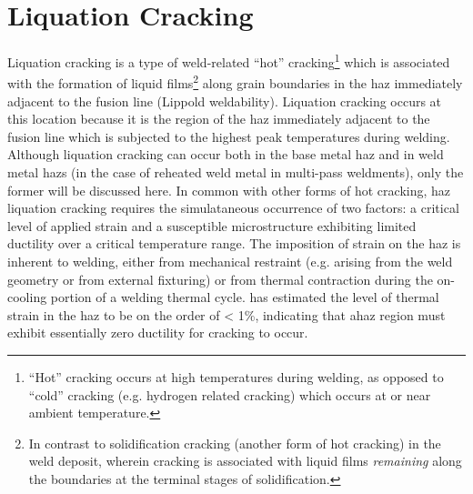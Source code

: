 \section{Liquation Cracking} \label{sec:liquation-cracking}
Liquation cracking is a type of weld-related “hot” cracking\footnote{“Hot” cracking occurs at high temperatures during welding, as opposed to “cold” cracking (e.g. hydrogen related cracking) which occurs at or near ambient temperature.} which is associated with the formation of liquid films\footnote{In contrast to solidification cracking (another form of hot cracking) in the weld deposit, wherein cracking is associated with liquid films \emph{remaining} along the boundaries at the terminal stages of solidification.} along grain boundaries in the \gls{haz} immediately adjacent to the fusion line (Lippold weldability). Liquation cracking occurs at this location because it is the region of the \gls{haz} immediately adjacent to the fusion line which is subjected to the highest peak temperatures during welding. Although liquation cracking can occur both in the base metal \gls{haz} and in weld metal \gls{haz}s (in the case of reheated weld metal in multi-pass weldments), only the former will be discussed here. In common with other forms of hot cracking, \gls{haz} liquation cracking requires the simulataneous occurrence of two factors: a critical level of applied strain and a susceptible microstructure exhibiting limited ductility over a critical temperature range. The imposition of strain on the \gls{haz} is inherent to welding, either from mechanical restraint (e.g. arising from the weld geometry or from external fixturing) or from thermal contraction during the on-cooling portion of a welding thermal cycle. \citet{yeniscavich_correlation_1970} has estimated the level of thermal strain in the \gls{haz} to be on the order of < 1\%, indicating that a\gls{haz} region must exhibit essentially zero ductility for cracking to occur. 


